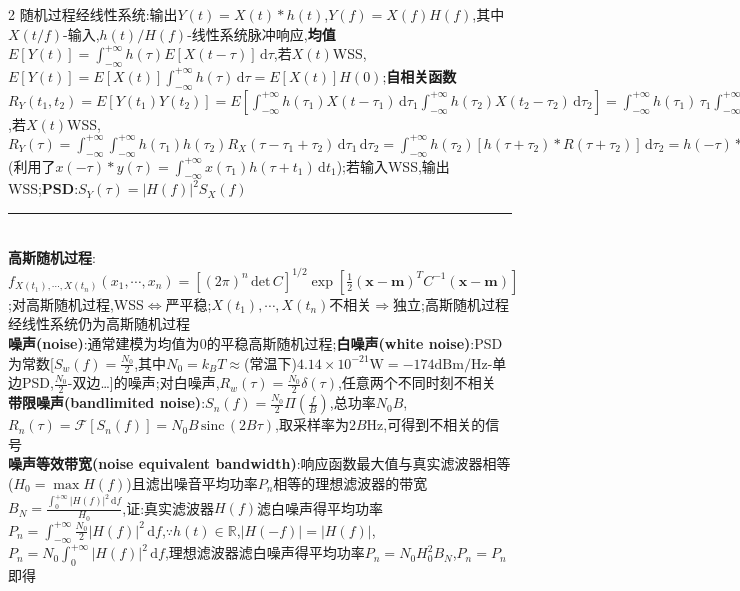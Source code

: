 \documentclass[UTF8,a4paper,10pt]{article}
\providecommand{\abs}[1]{\left\lvert#1\right\rvert}
\providecommand{\sinc}{\,\text{sinc}\,}
\providecommand{\det}{\,\text{det}\,}
\begin{document}
\begin{multicols}{2}
    随机过程经线性系统:输出$Y(t)=X(t)*h(t)$,$Y(f)=X(f)H(f)$,其中$X(t/f)$-输入,$h(t)/H(f)$-线性系统脉冲响应,\textbf{均值}$E[Y(t)]=\int_{-\infty}^{+\infty}h(\tau)E[X(t-\tau)]\,\mathrm{d}\tau$,若$X(t)$WSS,$E[Y(t)]=E[X(t)]\int_{-\infty}^{+\infty}h(\tau)\,\mathrm{d}\tau=E[X(t)]H(0)$;\textbf{自相关函数}$R_Y(t_1,t_2)=E[Y(t_1)Y(t_2)]=E[\int_{-\infty}^{+\infty}h(\tau_1)X(t-\tau_1)\,\mathrm{d}\tau_1\int_{-\infty}^{+\infty}h(\tau_2)X(t_2-\tau_2)\,\mathrm{d}\tau_2]=\int_{-\infty}^{+\infty}h(\tau_1)\,\tau_1\int_{-\infty}^{+\infty}h(\tau_2)E[X(t-\tau_1)X(t-\tau_2)]\,\mathrm{d}\tau_2$,若$X(t)$WSS,$R_Y(\tau)=\int_{-\infty}^{+\infty}\int_{-\infty}^{+\infty}h(\tau_1)h(\tau_2)R_X(\tau-\tau_1+\tau_2)\,\mathrm{d}\tau_1\,\mathrm{d}\tau_2=\int_{-\infty}^{+\infty}h(\tau_2)[h(\tau+\tau_2)*R(\tau+\tau_2)]\,\mathrm{d}\tau_2=h(-\tau)*h(\tau)*R_X(\tau)$(利用了$x(-\tau)*y(\tau)=\int_{-\infty}^{+\infty}x(\tau_1)h(\tau+t_1)\,\mathrm{d}t_1$);若输入WSS,输出WSS;\textbf{PSD}:$S_Y(\tau)=\abs{H(f)}^2S_X(f)$\\
    \rule{\columnwidth}{.5pt}\\
    \textbf{高斯随机过程}:$f_{X(t_1),\cdots,X(t_n)}(x_1,\cdots,x_n)=[(2\pi)^n\det C]^{1/2}\exp[\frac{1}{2}(\bm{x}-\bm{m})^TC^{-1}(\bm{x}-\bm{m})]$;对高斯随机过程,WSS$\Leftrightarrow$严平稳;$X(t_1),\cdots,X(t_n)$不相关$\Rightarrow$独立;高斯随机过程经线性系统仍为高斯随机过程\\
    \textbf{噪声(noise)}:通常建模为均值为$0$的平稳高斯随机过程;\textbf{白噪声(white noise)}:PSD为常数[$S_w(f)=\frac{N_0}{2}$,其中$N_0=k_BT\approx$(常温下)$4.14\times 10^{-21}\mathrm{W}=-174\mathrm{dBm/Hz}$-单边PSD,$\frac{N_0}{2}$-双边…]的噪声;对白噪声,$R_w(\tau)=\frac{N_0}{2}\delta(\tau)$,任意两个不同时刻不相关\\
    \textbf{带限噪声(bandlimited noise)}:$S_n(f)=\frac{N_0}{2}\Pi(\frac{f}{B})$,总功率$N_0B$,$R_n(\tau)=\mathscr{F}[S_n(f)]=N_0B\sinc(2B\tau)$,取采样率为$2B$Hz,可得到不相关的信号\\
    \textbf{噪声等效带宽(noise equivalent bandwidth)}:响应函数最大值与真实滤波器相等($H_0=\max{H(f)}$)且滤出噪音平均功率$P_n$相等的理想滤波器的带宽$B_N=\frac{\int_0^{+\infty}\abs{H(f)}^2\,\mathrm{d}f}{H_0}$,证:真实滤波器$H(f)$滤白噪声得平均功率$P_n=\int_{-\infty}^{+\infty}\frac{N_0}{2}\abs{H(f)}^2\,\mathrm{d}f$,$\because h(t)\in\mathbb{R}$,$\abs{H(-f)}=\abs{H(f)}$,$P_n=N_0\int_0^{+\infty}\abs{H(f)}^2\,\mathrm{d}f$,理想滤波器滤白噪声得平均功率$P_n=N_0H_0^2B_N$,$P_n=P_n$即得\\

\end{multicols}
\end{document}
